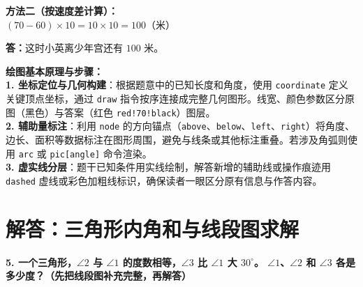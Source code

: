 \noindent
\textbf{方法二（按速度差计算）：}\\
$(70 - 60) \times 10 = 10 \times 10 = 100$（米）

\vspace{0.4cm}

\noindent
\textbf{答：}这时小英离少年宫还有 $100$ 米。

\vspace{0.8cm}


\vspace{0.6cm}

{\small\color{blue!70!black}
\textbf{绘图基本原理与步骤：}\\
\textbf{1. 坐标定位与几何构建}：根据题意中的已知长度和角度，使用 \texttt{coordinate} 定义关键顶点坐标，通过 \texttt{draw} 指令按序连接成完整几何图形。线宽、颜色参数区分原图（黑色）与答案（红色 \texttt{red!70!black}）图层。\\
\textbf{2. 辅助量标注}：利用 \texttt{node} 的方向锚点（\texttt{above}、\texttt{below}、\texttt{left}、\texttt{right}）将角度、边长、面积等数据标注在图形周围，避免与线条或其他标注重叠。若涉及角弧则使用 \texttt{arc} 或 \texttt{pic[angle]} 命令渲染。\\
\textbf{3. 虚实线分层}：题干已知条件用实线绘制，解答新增的辅助线或操作痕迹用 \texttt{dashed} 虚线或彩色加粗线标识，确保读者一眼区分原有信息与作答内容。
}

\newpage



\newpage

\section{解答：三角形内角和与线段图求解}

\vspace{0.4cm}

\noindent\textbf{5. 一个三角形，$\angle 2$ 与 $\angle 1$ 的度数相等，$\angle 3$ 比 $\angle 1$ 大 $30^\circ$。 $\angle 1$、$\angle 2$ 和 $\angle 3$ 各是多少度？（先把线段图补充完整，再解答）}

\vspace{0.8cm}

